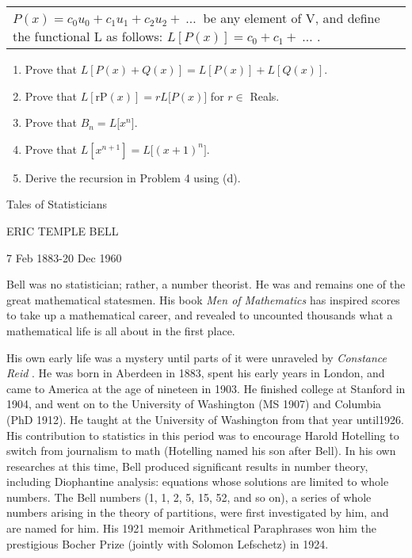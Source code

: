 \documentclass[10pt,letter]{article}
\renewenvironment{quote}
  {\begin{tabular}{|p{13cm}}}
  {\end{tabular}}
\begin{document}
\begin{quote}
\(P\left( x \right) = c_{0}u_{0} + c_{1}u_{1} + c_{2}u_{2} + \ \ldots\ \)
be any element of V, and define the functional L as follows:
\(L\left\lbrack P\left( x \right) \right\rbrack = c_{0} + c_{1} + \ \ldots\)
.

\end{quote}
\begin{enumerate}
\def\labelenumi{\alph{enumi}.}

\item
  Prove that
  \(L\left\lbrack P\left( x \right) + Q\left( x \right) \right\rbrack = L\left\lbrack P\left( x \right) \right\rbrack + L\left\lbrack Q\left( x \right) \right\rbrack.\)
\item
  Prove that
  \(L\left\lbrack \text{rP}\left( x \right) \right\rbrack = rL\lbrack P\left( x \right)\rbrack\)
  for \(r \in\) Reals.
\item
  Prove that \(B_{n} = L\lbrack x^{n}\rbrack\).
\item
  Prove that
  \(L\left\lbrack x^{n + 1} \right\rbrack = L\lbrack\left( x + 1 \right)^{n}\rbrack\).
\item
  Derive the recursion in Problem 4 using (d).

\end{enumerate}

Tales of Statisticians

ERIC TEMPLE BELL

7 Feb 1883-20 Dec 1960

Bell was no statistician; rather, a number theorist. He was and remains
one of the great mathematical statesmen. His book \emph{Men of
Mathematics} has inspired scores to take up a mathematical career, and
revealed to uncounted thousands what a mathematical life is all about in
the first place.

His own early life was a mystery until parts of it were unraveled by
\emph{Constance Reid} . He was born in Aberdeen in 1883, spent his early
years in London, and came to America at the age of nineteen in 1903. He
finished college at Stanford in 1904, and went on to the University of
Washington (MS 1907) and Columbia (PhD 1912). He taught at the
University of Washington from that year until1926. His contribution to
statistics in this period was to encourage Harold Hotelling to switch
from journalism to math (Hotelling named his son after Bell). In his own
researches at this time, Bell produced significant results in number
theory, including Diophantine analysis: equations whose solutions are
limited to whole numbers. The Bell numbers (1, 1, 2, 5, 15, 52, and so
on), a series of whole numbers arising in the theory of partitions, were
first investigated by him, and are named for him. His 1921 memoir
Arithmetical Paraphrases won him the prestigious Bocher Prize (jointly
with Solomon Lefschetz) in 1924.
\end{document}

